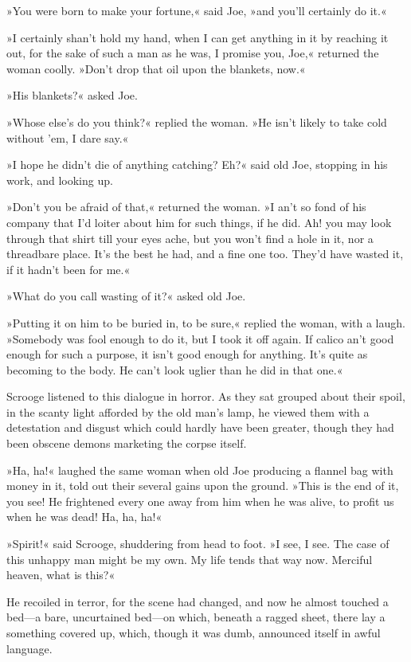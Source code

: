 »You were born to make your fortune,« said Joe, »and you'll certainly do it.«

»I certainly shan't hold my hand, when I can get anything in it by reaching it out, for the sake of such a man as he was, I promise you, Joe,« returned the woman coolly. »Don't drop that oil upon the blankets, now.«

»His blankets?« asked Joe.

»Whose else's do you think?« replied the woman. »He isn't likely to take cold without 'em, I dare say.«

»I hope he didn't die of anything catching? Eh?« said old Joe, stopping in his work, and looking up.

»Don't you be afraid of that,« returned the woman. »I an't so fond of his company that I'd loiter about him for such things, if he did. Ah! you may look through that shirt till your eyes ache, but you won't find a hole in it, nor a threadbare place. It's the best he had, and a fine one too. They'd have wasted it, if it hadn't been for me.«

»What do you call wasting of it?« asked old Joe.

»Putting it on him to be buried in, to be sure,« replied the woman, with a laugh. »Somebody was fool enough to do it, but I took it off again. If calico an't good enough for such a purpose, it isn't good enough for anything. It's quite as becoming to the body. He can't look uglier than he did in that one.«

Scrooge listened to this dialogue in horror. As they sat grouped about their spoil, in the scanty light afforded by the old man's lamp, he viewed them with a detestation and disgust which could hardly have been greater, though they had been obscene demons marketing the corpse itself.

»Ha, ha!« laughed the same woman when old Joe producing a flannel bag with money in it, told out their several gains upon the ground. »This is the end of it, you see! He frightened every one away from him when he was alive, to profit us when he was dead! Ha, ha, ha!«

»Spirit!« said Scrooge, shuddering from head to foot. »I see, I see. The case of this unhappy man might be my own. My life tends that way now. Merciful heaven, what is this?«

He recoiled in terror, for the scene had changed, and now he almost touched a bed---a bare, uncurtained bed---on which, beneath a ragged sheet, there lay a something covered up, which, though it was dumb, announced itself in awful language.


